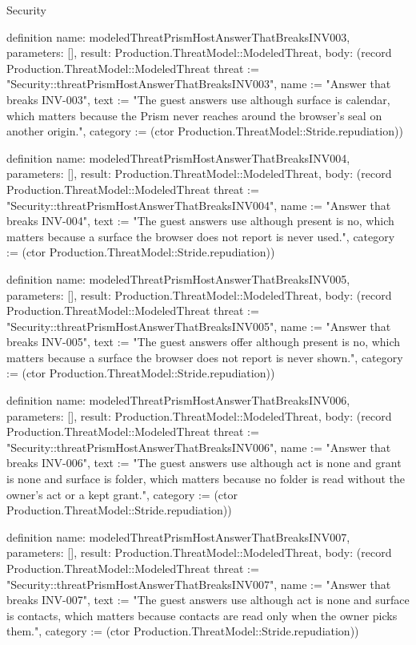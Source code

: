 \begin{lexlean}{Security}
\begin{semanticmodule}
definition{
  name: modeledThreatPrismHostAnswerThatBreaksINV003,
  parameters: [],
  result: Production.ThreatModel::ModeledThreat,
  body: (record Production.ThreatModel::ModeledThreat {threat := "Security::threatPrismHostAnswerThatBreaksINV003", name := "Answer that breaks INV-003", text := "The guest answers use although surface is calendar, which matters because the Prism never reaches around the browser's seal on another origin.", category := (ctor Production.ThreatModel::Stride.repudiation)})
}

definition{
  name: modeledThreatPrismHostAnswerThatBreaksINV004,
  parameters: [],
  result: Production.ThreatModel::ModeledThreat,
  body: (record Production.ThreatModel::ModeledThreat {threat := "Security::threatPrismHostAnswerThatBreaksINV004", name := "Answer that breaks INV-004", text := "The guest answers use although present is no, which matters because a surface the browser does not report is never used.", category := (ctor Production.ThreatModel::Stride.repudiation)})
}

definition{
  name: modeledThreatPrismHostAnswerThatBreaksINV005,
  parameters: [],
  result: Production.ThreatModel::ModeledThreat,
  body: (record Production.ThreatModel::ModeledThreat {threat := "Security::threatPrismHostAnswerThatBreaksINV005", name := "Answer that breaks INV-005", text := "The guest answers offer although present is no, which matters because a surface the browser does not report is never shown.", category := (ctor Production.ThreatModel::Stride.repudiation)})
}

definition{
  name: modeledThreatPrismHostAnswerThatBreaksINV006,
  parameters: [],
  result: Production.ThreatModel::ModeledThreat,
  body: (record Production.ThreatModel::ModeledThreat {threat := "Security::threatPrismHostAnswerThatBreaksINV006", name := "Answer that breaks INV-006", text := "The guest answers use although act is none and grant is none and surface is folder, which matters because no folder is read without the owner's act or a kept grant.", category := (ctor Production.ThreatModel::Stride.repudiation)})
}

definition{
  name: modeledThreatPrismHostAnswerThatBreaksINV007,
  parameters: [],
  result: Production.ThreatModel::ModeledThreat,
  body: (record Production.ThreatModel::ModeledThreat {threat := "Security::threatPrismHostAnswerThatBreaksINV007", name := "Answer that breaks INV-007", text := "The guest answers use although act is none and surface is contacts, which matters because contacts are read only when the owner picks them.", category := (ctor Production.ThreatModel::Stride.repudiation)})
}


\end{semanticmodule}
\end{lexlean}
